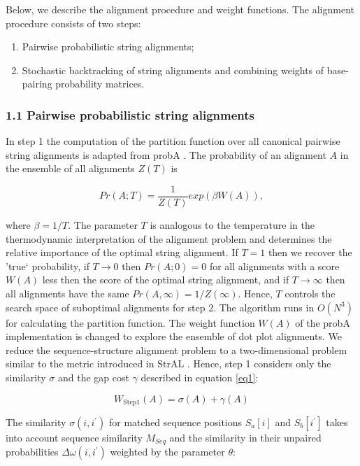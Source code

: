 \documentclass{bmcart}
\begin{document}
Below, we describe the alignment procedure and weight functions.
The alignment procedure consists of two steps:
\begin{enumerate}
  \item Pairwise probabilistic string alignments; 
  \item Stochastic backtracking of string alignments and combining
	  weights of base-pairing probability matrices.
\end{enumerate}

\subsubsection*{1.1 Pairwise probabilistic string alignments}
In step 1 the computation of the partition function over all canonical pairwise
string alignments is adapted from probA \cite{Muckstein12385998}. The
probability of an alignment $A$ in the ensemble of all alignments $Z(T)$ is

\begin{equation}\label{probA}
	Pr(A;T) = \frac{1}{Z(T)} exp(\beta W(A)),
\end{equation}

\noindent where $\beta = 1 / T$. The parameter $T$ is analogous to the temperature in the
thermodynamic interpretation of the alignment problem and determines the
relative importance of the optimal string alignment. If $T=1$ then we recover the
'true` probability, if $T\to0$ then $Pr(A;0)=0$ for all alignments with a score
$W(A)$ less then the score of the optimal string alignment, and if $T\to\infty$ then
all alignments have the same $Pr(A,\infty)=1/Z(\infty)$.  Hence, $T$ controls
the search space of suboptimal alignments for step 2. The algorithm runs in
$O(N^3)$ for calculating the partition function. 
The weight function $W(A)$ of
the probA implementation is changed to explore the ensemble of dot plot
alignments. We reduce the sequence-structure alignment problem to a
two-dimensional problem similar to the metric introduced in StrAL
\cite{Dalli16613908}. Hence, step 1 considers only the similarity $\sigma$ and
the gap cost $\gamma$ described in equation \ref{eq1}:

\begin{equation}\label{wstep1}
	W_{\mbox{Step1}}(A) = \sigma(A) + \gamma(A)
\end{equation}

\noindent The similarity $\sigma(i,i^\prime)$ for matched sequence positions $S_a[i]$ and
$S_b[i^\prime]$ takes into account sequence similarity $M_{Seq}$ and the
similarity in their unpaired probabilities $\Delta \omega(i,i^\prime)$ weighted
by the parameter $\theta$:
\end{document}
